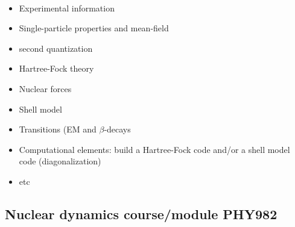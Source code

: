 \documentclass[%
twoside,                 %
final,                   %
10pt]{article}
\begin{document}
\paragraph{}
\begin{itemize}
\item Experimental information

\item Single-particle properties and mean-field

\item second quantization

\item Hartree-Fock theory

\item Nuclear forces

\item Shell model

\item Transitions (EM and $\beta$-decays

\item Computational elements: build a Hartree-Fock code and/or a shell model code (diagonalization)

\item etc
\end{itemize}

\noindent



\subsection*{Nuclear dynamics course/module  PHY982}

\paragraph{}
\end{document}
